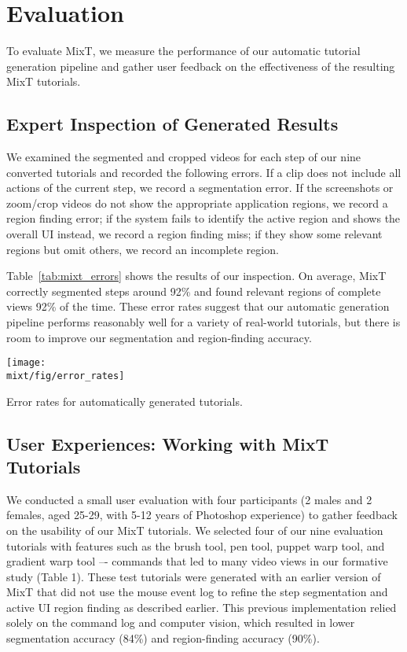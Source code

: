 \section{Evaluation}

To evaluate MixT, we measure the performance of our automatic tutorial generation pipeline and gather user feedback on the effectiveness of the resulting MixT tutorials.

\subsection{Expert Inspection of Generated Results}
We examined the segmented and cropped videos for each step of our nine converted tutorials and recorded the following errors. If a clip does not include all actions of the current step, we record a segmentation error. If the screenshots or zoom/crop videos do not show the appropriate application regions, we record a region finding error; if the system fails to identify the active region and shows the overall UI instead, we record a region finding miss; if they show some relevant regions but omit others, we record an incomplete region.

Table~\ref{tab:mixt_errors} shows the results of our inspection. On average, MixT correctly segmented steps around 92\% and found relevant regions of complete views 92\% of the time. These error rates suggest that our automatic generation pipeline performs reasonably well for a variety of real-world tutorials, but there is room to improve our segmentation and region-finding accuracy.

\begin{table}
  \centering
  \texttt{[image: \\mixt/fig/error\_rates]}
  \caption{Error rates for automatically generated tutorials.}
  \label{tab:mixt_errors}
\end{table}


\subsection{User Experiences: Working with MixT Tutorials}
We conducted a small user evaluation with four participants (2 males and 2 females, aged 25-29, with 5-12 years of Photoshop experience) to gather feedback on the usability of our MixT tutorials. We selected four of our nine evaluation tutorials with features such as the brush tool, pen tool, puppet warp tool, and gradient warp tool –- commands that led to many video views in our formative study (Table 1). These test tutorials were generated with an earlier version of MixT that did not use the mouse event log to refine the step segmentation and active UI region finding as described earlier. This previous implementation relied solely on the command log and computer vision, which resulted in lower segmentation accuracy (84\%) and region-finding accuracy (90\%).

